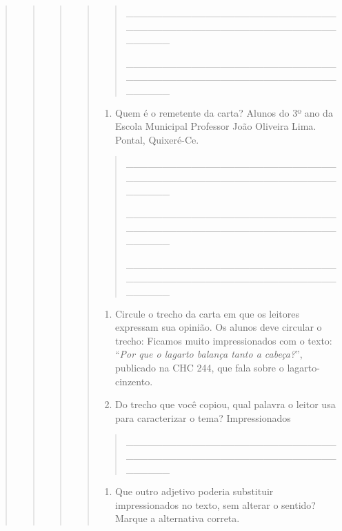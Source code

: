 \begin{quote}
\begin{quote}
\begin{quote}
\begin{quote}
\begin{quote}
\_\_\_\_\_\_\_\_\_\_\_\_\_\_\_\_\_\_\_\_\_\_\_\_\_\_\_\_\_\_\_\_\_\_\_\_\_\_\_\_\_\_\_\_\_\_\_\_\_\_\_\_\_\_\_\_\_\_\_\_\_\_\_\_

\_\_\_\_\_\_\_\_\_\_\_\_\_\_\_\_\_\_\_\_\_\_\_\_\_\_\_\_\_\_\_\_\_\_\_\_\_\_\_\_\_\_\_\_\_\_\_\_\_\_\_\_\_\_\_\_\_\_\_\_\_\_\_\_
\end{quote}

\begin{enumerate}
\def\labelenumi{\alph{enumi})}
\item
  Quem é o remetente da carta? Alunos do 3º ano da Escola Municipal
  Professor João Oliveira Lima. Pontal, Quixeré-Ce.
\end{enumerate}

\begin{quote}
\_\_\_\_\_\_\_\_\_\_\_\_\_\_\_\_\_\_\_\_\_\_\_\_\_\_\_\_\_\_\_\_\_\_\_\_\_\_\_\_\_\_\_\_\_\_\_\_\_\_\_\_\_\_\_\_\_\_\_\_\_\_\_\_

\_\_\_\_\_\_\_\_\_\_\_\_\_\_\_\_\_\_\_\_\_\_\_\_\_\_\_\_\_\_\_\_\_\_\_\_\_\_\_\_\_\_\_\_\_\_\_\_\_\_\_\_\_\_\_\_\_\_\_\_\_\_\_\_

\_\_\_\_\_\_\_\_\_\_\_\_\_\_\_\_\_\_\_\_\_\_\_\_\_\_\_\_\_\_\_\_\_\_\_\_\_\_\_\_\_\_\_\_\_\_\_\_\_\_\_\_\_\_\_\_\_\_\_\_\_\_\_\_
\end{quote}

\begin{enumerate}
\def\labelenumi{\alph{enumi})}
\item
  Circule o trecho da carta em que os leitores expressam sua opinião. Os
  alunos deve circular o trecho: Ficamos muito impressionados com o
  texto: ``\emph{Por que o lagarto balança tanto a cabeça?}'', publicado
  na CHC 244, que fala sobre o lagarto-cinzento.
\item
  Do trecho que você copiou, qual palavra o leitor usa para caracterizar
  o tema? Impressionados
\end{enumerate}

\begin{quote}
\_\_\_\_\_\_\_\_\_\_\_\_\_\_\_\_\_\_\_\_\_\_\_\_\_\_\_\_\_\_\_\_\_\_\_\_\_\_\_\_\_\_\_\_\_\_\_\_\_\_\_\_\_\_\_\_\_\_\_\_\_\_\_\_
\end{quote}

\begin{enumerate}
\def\labelenumi{\alph{enumi})}
\item
  Que outro adjetivo poderia substituir impressionados no texto, sem
  alterar o sentido? Marque a alternativa correta.
\end{enumerate}


\end{quote}
\end{quote}
\end{quote}
\end{quote}
